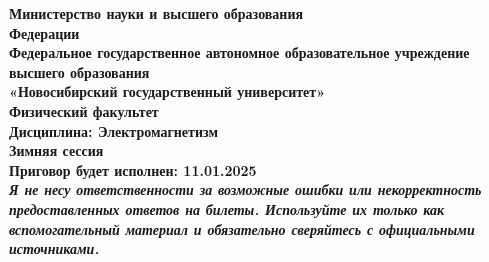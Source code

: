 \documentclass[a4paper,12pt]{article}
\newcommand{\kr}[1]{\textit{#1}}
\begin{document}
\begin{titlepage}
    \begin{center}
        \textbf{\large Министерство науки и высшего образования}\\
        \textbf{ Федерации} \\
        \textbf{\large Федеральное государственное автономное образовательное
                        учреждение высшего образования} \\
        \textbf{\large «Новосибирский государственный университет» } \\
        \vspace{1em}
        \textbf{\large Физический факультет} \\
        \vspace{5em}
        \textbf{\Large Дисциплина: Электромагнетизм} \\
        \vspace{2em}
        \textbf{\Large Зимняя сессия } \\
        \vspace{25em}
        \textbf{\large Приговор будет исполнен: 11.01.2025}\\
        \vspace{1em}
        \textbf{\kr {Я не несу ответственности за возможные ошибки или некорректность предоставленных ответов на билеты. Используйте их только как вспомогательный материал и обязательно сверяйтесь с официальными источниками.}  }
    \end{center}
\end{titlepage}

\newpage
\tableofcontents %
\newpage


    \newpage











    \newpage



	

	\newpage





\end{document}
